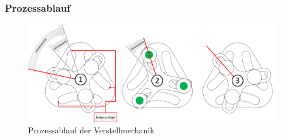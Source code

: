\subsubsection{Prozessablauf}

\begin{figure}[H]
	\includegraphics[width=1\textwidth]{Illustrationen/6-Umsetzung/Prozessablauf_Verstellmechanik.png}
	\caption{Prozessablauf der Verstellmechanik}
	\label{fig:Prozessablauf_Verstellmechanik}
\end{figure}

